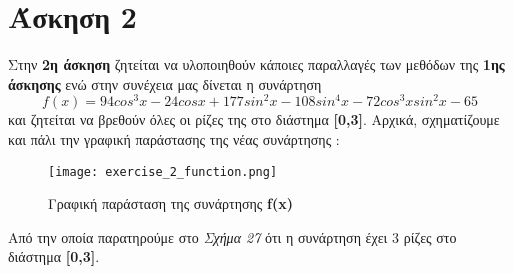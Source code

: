 \documentclass[First Project.tex]{subfiles}
\begin{document}
\section{ Άσκηση 2 }
Στην \textbf{2η άσκηση} ζητείται να υλοποιηθούν κάποιες παραλλαγές των μεθόδων της \textbf{1ης άσκησης} ενώ 
στην συνέχεια μας δίνεται η συνάρτηση 
\begin{equation*}
    f(x) = 94cos^{3}x - 24cosx + 177sin^{2}x - 108sin^{4}x -72cos^{3}xsin^{2}x - 65
\end{equation*}
και ζητείται να βρεθούν όλες οι ρίζες της στο διάστημα \textbf{[0,3]}. Αρχικά, σχηματίζουμε και πάλι την γραφική παράστασης της νέας
συνάρτησης :
\begin{figure}[h!]
    \centering
    \captionsetup{justification=centering}
    \begin{center}
        \texttt{[image: exercise\_2\_function.png]}    
        \caption{Γραφική παράσταση της συνάρτησης \textlatin{\textbf{f(x)}}}
    \end{center}
\end{figure}

Από την οποία παρατηρούμε στο \textit{Σχήμα 27} ότι η συνάρτηση έχει 3 ρίζες στο διάστημα \textbf{[0,3]}.
\end{document}
